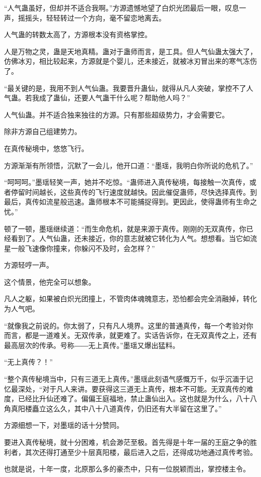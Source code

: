 \begin{this_body}
“人气蛊虽好，但却并不适合我啊。”方源遗憾地望了白炽光团最后一眼，叹息一声，摇摇头，轻轻转过一个方向，毫不留恋地离去。

人气蛊的转数太高了，方源根本没有资格掌控。

人是万物之灵，蛊是天地真精。蛊对于蛊师而言，是工具。但人气仙蛊太强大了，仿佛冰刃，相比较起来，方源就是个婴儿，还未接近，就被冰刃冒出来的寒气冻伤了。

“最关键的是，我用不到人气仙蛊。我要晋升蛊仙，就得从凡人突破，掌控不了人气蛊。若我成了蛊仙，还要人气蛊干什么呢？帮助他人吗？”

人气仙蛊。并不适合独来独往的方源。只有那些超级势力，才会需要它。

除非方源自己组建势力。

在真传秘境中，悠悠飞行。

方源渐渐有所领悟，沉默了一会儿，他开口道：“墨瑶，我明白你所说的危机了。”

“呵呵呵。”墨瑶轻笑一声，她并不吃惊。“蛊师进入真传秘境，每接触一次真传，或者停留时间越长，这些真传的飞行速度就越快。因此催促蛊师，尽快选择真传。到最后，真传如流星般迅速。蛊师根本不可能捕捉得到。更因此，使得蛊师有生命之忧。”

顿了一顿，墨瑶继续道：“而生命危机，就是来源于真传。刚刚的无双真传，你已经看到了。人气仙蛊，还未接近，你的意志就被它转化为人气。想想看。当它如流星一般飞速像你撞来，你躲闪不及时，会怎样？”

方源轻哼一声。

这个情景，他完全可以想象。

凡人之躯，如果被白炽光团撞上，不管肉体魂魄意志，恐怕都会完全消融掉，转化为人气吧。

“就像我之前说的。你太弱了，只有凡人境界。这里的普通真传，每一个考验对你而言，都是一道难关。无双传承，就更难了。实话告诉你，在无双真传之上，还有最高层次的传承。号称――无上真传。”墨瑶又爆出猛料。

“无上真传？！”

“整个真传秘境当中，只有三道无上真传。”墨瑶此刻语气感慨万千，似乎沉湎于记忆最深处，“对于凡人来讲。要获得这三道无上真传，根本不可能。无双真传的难度，已经比升仙还难了。偏偏王庭福地，禁止蛊仙出入。这也就是为什么，八十八角真阳楼矗立这么久，其中八十八道真传，仍旧还有大半留在这里了。”

方源细想一下，对墨瑶的话十分赞同。

要进入真传秘境，就十分困难，机会渺茫至极。首先得是十年一届的王庭之争的胜利者，其次还得打通至少十层真阳楼，最后进入之后，还得成功地通过真传考验。

也就是说，十年一度，北原那么多的豪杰中，只有一位脱颖而出，掌控楼主令。


\end{this_body}
